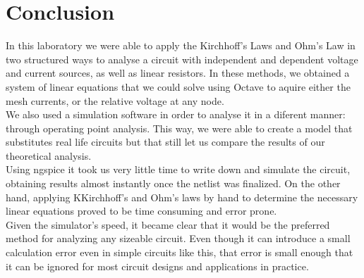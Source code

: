 \section{Conclusion}
In this laboratory we were able to apply the Kirchhoff's Laws and Ohm's Law in two structured ways to analyse a circuit with independent and dependent voltage and current sources, as well as linear resistors. In these methods, we obtained a system of linear equations that we could solve using Octave to aquire either the mesh currents, or the relative voltage at any node.\\
We also used a simulation software in order to analyse it in a diferent manner: through operating point analysis. This way, we were able to create a model that substitutes real life circuits but that still let us compare the results of our theoretical analysis.\\
Using ngspice it took us very little time to write down and simulate the circuit, obtaining results almost instantly once the netlist was finalized. On the other hand, applying KKirchhoff's and Ohm's laws by hand to determine the necessary linear equations proved to be time consuming and error prone.\\
Given the simulator's speed, it became clear that it would be the preferred method for analyzing any sizeable circuit. Even though it can introduce a small calculation error even in simple circuits like this, that error is small enough that it can be ignored for most circuit designs and applications in practice.
